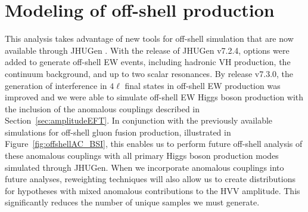 



\section{Modeling of off-shell production}


This analysis takes advantage of new tools for off-shell simulation that are now available through JHUGen \cite{2010,2012,2014,2016,2020,2021}. With the release of JHUGen v7.2.4, options were added to generate off-shell EW events, including hadronic VH production, the continuum background, and up to two scalar resonances. By release v7.3.0, the generation of interference in $4\ell$ final states in off-shell EW production was improved and we were able to simulate off-shell EW Higgs boson production with the inclusion of the anomalous couplings described in Section~\ref{sec:amplitudeEFT}. In conjunction with the previously available simulations for off-shell gluon fusion production, illustrated in Figure~\ref{fig:offshellAC_BSI}, this enables us to perform future off-shell analysis of these anomalous couplings with all primary Higgs boson production modes simulated through JHUGen. When we incorporate anomalous couplings into future analyses, reweighting techniques will also allow us to create distributions for hypotheses with mixed anomalous contributions to the HVV amplitude. This significantly reduces the number of unique samples we must generate. 

